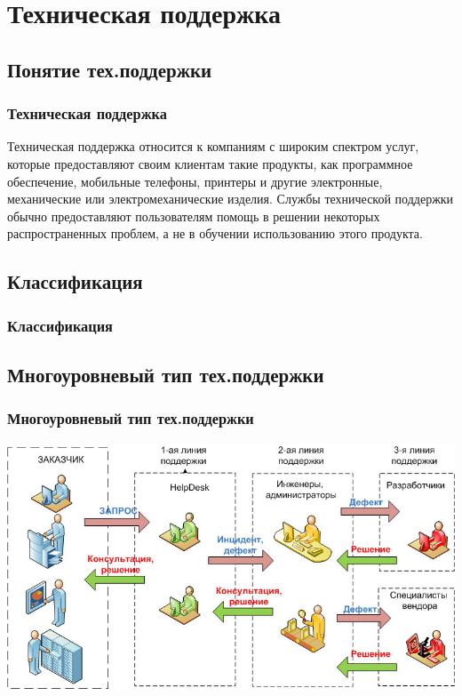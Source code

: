 \documentclass{industrial-development}
\begin{document}
\lecturenotes


\section{Техническая поддержка}

\subsection{Понятие тех.поддержки}

\begin{frame} \frametitle{Техническая поддержка}
	\begin{definition} 
		\alert {Техническая поддержка} относится к компаниям с широким спектром услуг, которые предоставляют своим клиентам такие продукты, как программное обеспечение, мобильные телефоны, принтеры и другие электронные, механические или электромеханические изделия. Службы технической поддержки обычно предоставляют пользователям помощь в решении некоторых распространенных проблем, а не в обучении использованию этого продукта.
	\end{definition}
\end{frame}
\lecturenotes

\subsection{Классификация}
\begin{frame} \frametitle{Классификация}

\end{frame}
\lecturenotes

\subsection{Многоуровневый тип тех.поддержки}
\begin{frame} \frametitle{Многоуровневый тип тех.поддержки}
    \centerline{\includegraphics[width=\textwidth]{structure.jpg}}
\end{frame}
\end{document}
